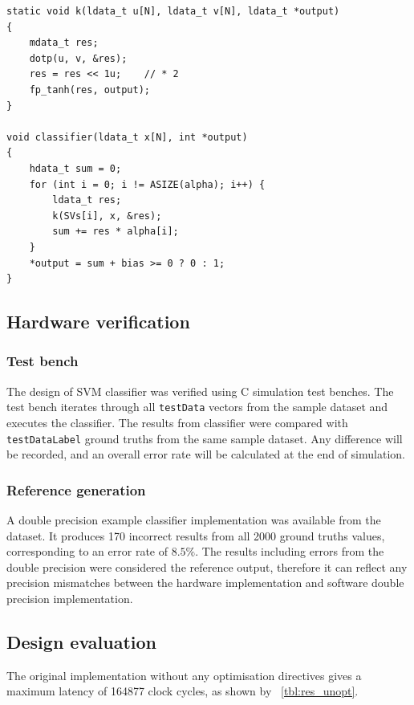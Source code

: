 \documentclass[journal]{IEEEtran}
\newcommand{\tref}[1]{\tablename~\ref{#1}}
\begin{document}
\begin{lstlisting}[caption={Top-level SVM classifier},captionpos=b,label=lst:clas]
static void k(ldata_t u[N], ldata_t v[N], ldata_t *output)
{
	mdata_t res;
	dotp(u, v, &res);
	res = res << 1u;	// * 2
	fp_tanh(res, output);
}

void classifier(ldata_t x[N], int *output)
{
	hdata_t sum = 0;
	for (int i = 0; i != ASIZE(alpha); i++) {
		ldata_t res;
		k(SVs[i], x, &res);
		sum += res * alpha[i];
	}
	*output = sum + bias >= 0 ? 0 : 1;
}	
\end{lstlisting}

\subsection{Hardware verification}

\subsubsection{Test bench}

The design of SVM classifier was verified using C simulation test benches. The test bench iterates through all \texttt{testData} vectors from the sample dataset and executes the classifier. The results from classifier were compared with \texttt{testDataLabel} ground truths from the same sample dataset. Any difference will be recorded, and an overall error rate will be calculated at the end of simulation.

\subsubsection{Reference generation}

A double precision example classifier implementation was available from the dataset. It produces 170 incorrect results from all 2000 ground truths values, corresponding to an error rate of $8.5 \%$. The results including errors from the double precision were considered the reference output, therefore it can reflect any precision mismatches between the hardware implementation and software double precision implementation.

\subsection{Design evaluation}

The original implementation without any optimisation directives gives a maximum latency of 164877 clock cycles, as shown by \tref{tbl:res_unopt}.
\end{document}

